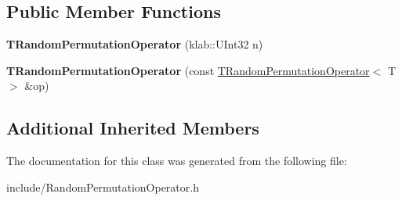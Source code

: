 \subsection*{Public Member Functions}
\begin{DoxyCompactItemize}
\item 
{\bfseries T\+Random\+Permutation\+Operator} (klab\+::\+U\+Int32 n)\hypertarget{classkl1p_1_1TRandomPermutationOperator_ac0b8d17f43222153336263cf7f16d9c7}{}\label{classkl1p_1_1TRandomPermutationOperator_ac0b8d17f43222153336263cf7f16d9c7}

\item 
{\bfseries T\+Random\+Permutation\+Operator} (const \hyperlink{classkl1p_1_1TRandomPermutationOperator}{T\+Random\+Permutation\+Operator}$<$ T $>$ \&op)\hypertarget{classkl1p_1_1TRandomPermutationOperator_ad4b521016b050cf879b2cd3bdbbeae84}{}\label{classkl1p_1_1TRandomPermutationOperator_ad4b521016b050cf879b2cd3bdbbeae84}

\end{DoxyCompactItemize}
\subsection*{Additional Inherited Members}


The documentation for this class was generated from the following file\+:\begin{DoxyCompactItemize}
\item 
include/Random\+Permutation\+Operator.\+h\end{DoxyCompactItemize}

